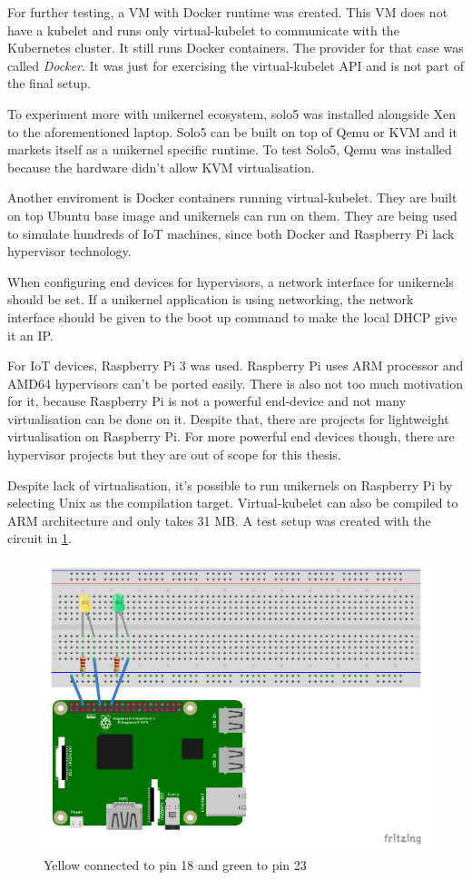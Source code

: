 For further testing, a VM with Docker runtime was created. This VM does not have a kubelet and runs only virtual-kubelet to communicate with the Kubernetes cluster. It still runs Docker containers. The provider for that case was called \textit{Docker}. It was just for exercising the virtual-kubelet API and is not part of the final setup.

To experiment more with unikernel ecosystem, solo5 was installed alongside Xen to the aforementioned laptop. Solo5 can be built on top of Qemu or KVM and it markets itself as a unikernel specific runtime. To test Solo5, Qemu was installed because the hardware didn't allow KVM virtualisation.

Another enviroment is Docker containers running virtual-kubelet. They are built on top Ubuntu base image and unikernels can run on them. They are being used to simulate hundreds of IoT machines, since both Docker and Raspberry Pi lack hypervisor technology.

When configuring end devices for hypervisors, a network interface for unikernels should be set. If a unikernel application is using networking, the network interface should be given to the boot up command to make the local DHCP give it an IP.


For IoT devices, Raspberry Pi 3 was used. Raspberry Pi uses ARM processor and AMD64 hypervisors can't be ported easily. There is also not too much motivation for it, because Raspberry Pi is not a powerful end-device and not many virtualisation can be done on it. Despite that, there are projects for lightweight virtualisation on Raspberry Pi. For more powerful end devices though, there are hypervisor projects but they are out of scope for this thesis.

Despite lack of virtualisation, it's possible to run unikernels on Raspberry Pi by selecting Unix as the compilation target. Virtual-kubelet can also be compiled to ARM architecture and only takes 31 MB. A test setup was created with the circuit in \ref{fig:rpi-diagram}.

\begin{figure}[htpb]
  \centering
  \includegraphics[height=0.6\textwidth]{figures/rpi-diagram.pdf}
  \caption{Yellow connected to pin 18 and green to pin 23} \label{fig:rpi-diagram}
\end{figure}

